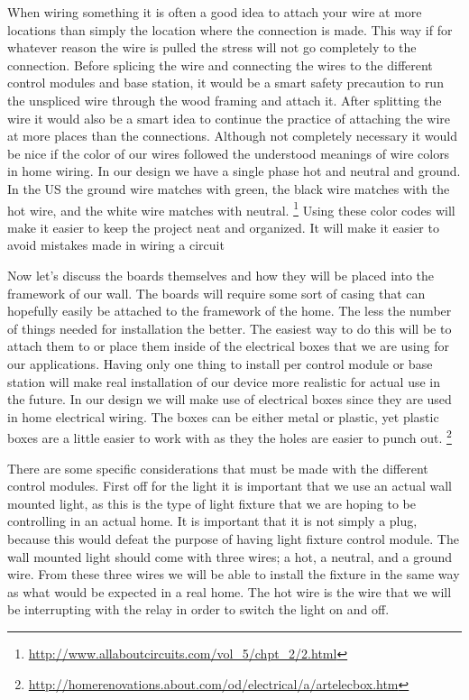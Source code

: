 When wiring something it is often a good idea to attach your wire at more
locations than simply the location where the connection is made. This way if
for whatever reason the wire is pulled the stress will not go completely to the
connection. Before splicing the wire and connecting the wires to the different
control modules and base station, it would be a smart safety precaution to run
the unspliced wire through the wood framing and attach it. After splitting the
wire it would also be a smart idea to continue the practice of attaching the
wire at more places than the connections. Although not completely necessary it
would be nice if the color of our wires followed the understood meanings of
wire colors in home wiring. In our design we have a single phase hot and
neutral and ground. In the US the ground wire matches with green, the black
wire matches with the hot wire, and the white wire matches with neutral.
\footnote{\url{http://www.allaboutcircuits.com/vol_5/chpt_2/2.html}}
Using these color codes will make it easier to keep the project neat and
organized. It will make it easier to avoid mistakes made in wiring a circuit

Now let{}'s discuss the boards themselves and how they will be placed into the
framework of our wall. The boards will require some sort of casing that can
hopefully easily be attached to the framework of the home. The less the number
of things needed for installation the better. The easiest way to do this will
be to attach them to or place them inside of the electrical boxes that we are
using for our applications. Having only one thing to install per control module
or base station will make real installation of our device more realistic for
actual use in the future. In our design we will make use of electrical boxes
since they are used in home electrical wiring. The boxes can be either metal or
plastic, yet plastic boxes are a little easier to work with as they the holes
are easier to punch out.
\footnote{\url{http://homerenovations.about.com/od/electrical/a/artelecbox.htm}}

There are some specific considerations that must be made with the different
control modules. First off for the light it is important that we use an actual
wall mounted light, as this is the type of light fixture that we are hoping to
be controlling in an actual home. It is important that it is not simply a plug,
because this would defeat the purpose of having light fixture control module.
The wall mounted light should come with three wires; a hot, a neutral, and a
ground wire. From these three wires we will be able to install the fixture in
the same way as what would be expected in a real home. The hot wire is the wire
that we will be interrupting with the relay in order to switch the light on and
off.

